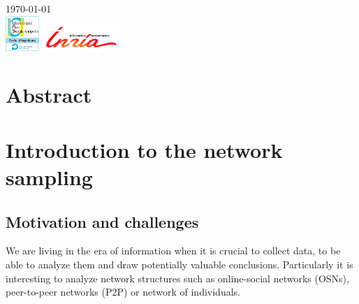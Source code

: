 \documentclass[12pt]{report}
\begin{document}
\begin{titlepage}

{\large \today}\\[1cm] %


\includegraphics[height=50px]{univer} 
\includegraphics[height=40px]{inria}\\[1cm] 
 

\vfill %

\end{titlepage}

\chapter{Abstract}

\chapter{Introduction to the network sampling}

\section{Motivation and challenges}

We are living in the era of information when it is crucial to collect data, to be able to analyze them and draw potentially valuable conclusions. Particularly it is interesting to analyze network structures such as online-social networks (OSNs), peer-to-peer networks (P2P) or network of individuals.
\end{document}
